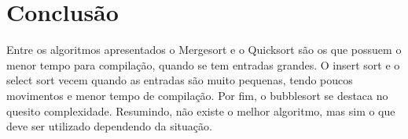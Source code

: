 \documentclass[a4paper.12pt]{article}
\begin{document}
\section {Conclusão}
Entre os algoritmos apresentados o Mergesort e o Quicksort são os que possuem o menor tempo para compilação, quando se tem entradas grandes. O insert sort e o select sort vecem quando as entradas são muito pequenas, tendo poucos movimentos e menor tempo de compilação. Por fim, o bubblesort se destaca no quesito complexidade. Resumindo, não  existe o melhor algoritmo, mas sim o que deve ser utilizado dependendo da situação.

\cite{yang11}

\end{document}
